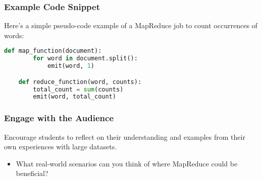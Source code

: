 \documentclass[aspectratio=169]{beamer}
\begin{document}
\begin{frame}[fragile]
    \frametitle{Example Code Snippet}
    Here’s a simple pseudo-code example of a MapReduce job to count occurrences of words:
    \begin{lstlisting}[language=Python]
    def map_function(document):
        for word in document.split():
            emit(word, 1)

    def reduce_function(word, counts):
        total_count = sum(counts)
        emit(word, total_count)
    \end{lstlisting}
\end{frame}

\begin{frame}[fragile]
    \frametitle{Engage with the Audience}
    Encourage students to reflect on their understanding and examples from their own experiences with large datasets. 
    \begin{itemize}
        \item What real-world scenarios can you think of where MapReduce could be beneficial?
    \end{itemize}
\end{frame}
\end{document}
